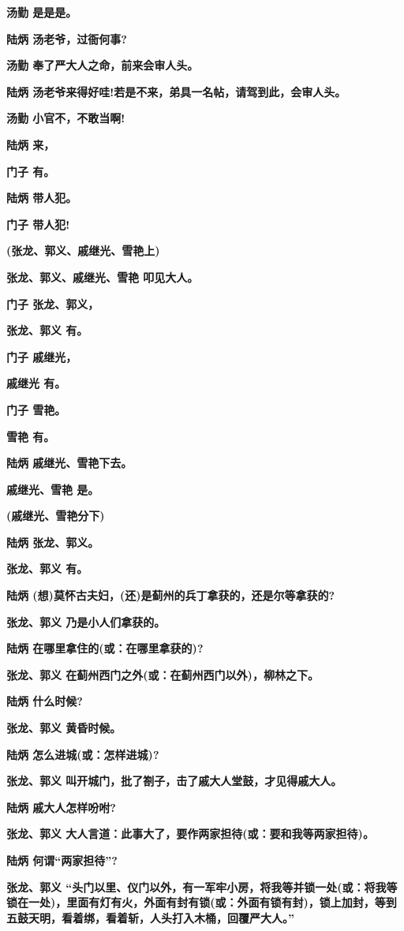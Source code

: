 \textbf{汤勤 是是是。}

\textbf{陆炳 汤老爷，过衙何事?}

\textbf{汤勤 奉了严大人之命，前来会审人头。}

\textbf{陆炳 汤老爷来得好哇!若是不来，弟具一名帖，请驾到此，会审人头。}

\textbf{汤勤 小官不，不敢当啊!}

\textbf{陆炳 来，}

\textbf{门子 有。}

\textbf{陆炳 带人犯。}

\textbf{门子 带人犯!}

\textbf{(张龙、郭义、戚继光、雪艳上)}

\textbf{张龙、郭义、戚继光、雪艳 叩见大人。}

\textbf{门子 张龙、郭义，}

\textbf{张龙、郭义 有。}

\textbf{门子 戚继光，}

\textbf{戚继光 有。}

\textbf{门子 雪艳。}

\textbf{雪艳 有。}

\textbf{陆炳 戚继光、雪艳下去。}

\textbf{戚继光、雪艳 是。}

\textbf{(戚继光、雪艳分下)}

\textbf{陆炳 张龙、郭义。}

\textbf{张龙、郭义 有。}

\textbf{陆炳 (想)莫怀古夫妇，(还)是蓟州的兵丁拿获的，还是尔等拿获的?}

\textbf{张龙、郭义 乃是小人们拿获的。}

\textbf{陆炳 在哪里拿住的(或：在哪里拿获的)?}

\textbf{张龙、郭义 在蓟州西门之外(或：在蓟州西门以外)，柳林之下。}

\textbf{陆炳 什么时候?}

\textbf{张龙、郭义 黄昏时候。}

\textbf{陆炳 怎么进城(或：怎样进城)?}

\textbf{张龙、郭义 叫开城门，批了劄子，击了戚大人堂鼓，才见得戚大人。}

\textbf{陆炳 戚大人怎样吩咐?}

\textbf{张龙、郭义
大人言道：此事大了，要作两家担待(或：要和我等两家担待)。}

\textbf{陆炳 何谓``两家担待''?}

\textbf{张龙、郭义
``头门以里、仪门以外，有一军牢小房，将我等并锁一处(或：将我等锁在一处)，里面有灯有火，外面有封有锁(或：外面有锁有封)，锁上加封，等到五鼓天明，看着绑，看着斩，人头打入木桶，回覆严大人。''}

